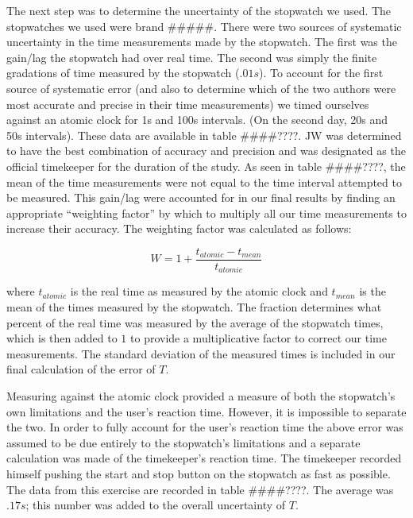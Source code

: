 \documentclass[iop]{emulateapj}
\def\fillin{\#\#\#\#????}
\begin{document}
The next step was to determine the uncertainty of the stopwatch we used.  The
stopwatches we used were brand \#\#\#\#\#.  There were two sources of systematic 
uncertainty in the time measurements made by the stopwatch.  The first was the 
gain/lag the stopwatch had over real time.  The second was simply the finite 
gradations of time measured by the stopwatch ($.01 s$).  To account for the 
first source of systematic error (and also to determine which of the two 
authors were most accurate and precise in their time measurements) we timed 
ourselves against an atomic clock for 1s and 100s intervals.  (On the second
day, 20s and 50s intervals).  These data are available in table \fillin.  JW 
was determined to have the best combination of accuracy and precision and was 
designated as the official timekeeper for the duration of the study.  As seen 
in table \fillin, the mean of the time measurements were not equal to the time 
interval attempted to be measured.  This gain/lag were accounted for in our 
final results by finding an appropriate ``weighting factor'' by which to 
multiply all our time measurements to increase their accuracy.  The weighting 
factor was calculated as follows:

\begin{equation}
\label{eq:timeweight}
W = 1 + \frac{t_{atomic}-t_{mean}}{t_{atomic}} 
\end{equation}

where $t_{atomic}$ is the real time as measured by the atomic clock 
and $t_{mean}$ is the mean of the times measured by the 
stopwatch.  The fraction determines what percent of the real time was measured 
by the average of the stopwatch times, which is then added to $1$ to provide a 
multiplicative factor to correct our time measurements.  The standard deviation 
of the measured times is included in our final calculation of the error of $T$. 

Measuring against the atomic clock provided a measure of both the stopwatch's 
own limitations and the user's reaction time.  However, it is impossible to 
separate the two.  In order to fully account for the user's reaction time the 
above error was assumed to be due entirely to the stopwatch's limitations and 
a separate calculation was made of the timekeeper's reaction time.  The 
timekeeper recorded himself pushing the start and stop button on the stopwatch 
as fast as possible.  The data from this exercise are recorded in table \fillin. 
The average was $.17s$; this number was added to the overall uncertainty of $T$. 
\end{document}
